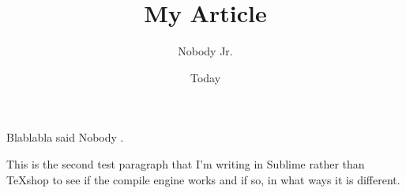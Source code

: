 \documentclass[11pt]{article}
\begin{document}
\title{My Article}
\author{Nobody Jr.}
\date{Today}
\maketitle

Blablabla said Nobody \cite{Nobody06}.

This is the second test paragraph that I'm writing in Sublime rather than TeXshop to see if the compile engine works and if so, in what ways it is different.



\end{document}
